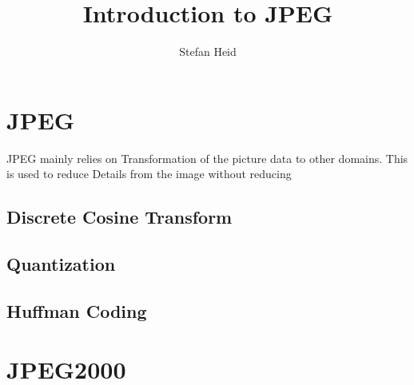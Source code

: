 \documentclass{scrartcl}
\author{Stefan Heid}
\title{Introduction to JPEG}
\begin{document}
\maketitle
\tableofcontents
\newpage

\section{JPEG}
JPEG mainly relies on Transformation of the picture data to other domains. This is used to reduce Details from the image without reducing 

\subsection{Discrete Cosine Transform}
\subsection{Quantization}
\subsection{Huffman Coding}

\section{JPEG2000}
\end{document}
